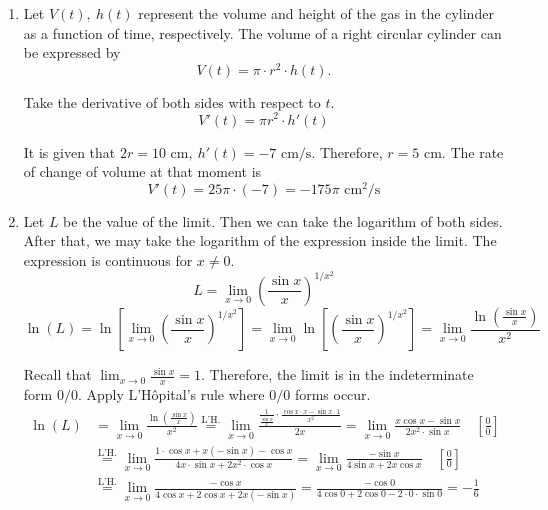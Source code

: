 \documentclass[a4paper, 12pt]{article}
\begin{document}
\begin{enumerate}[leftmargin=*,label=\textbf{\arabic*.}]
\begin{enumerate}[leftmargin=*,label=\textbf{\arabic*.}]
\begin{enumerate}[leftmargin=*,label=\textbf{\alph*.}]
\item If the cylinder is placed horizontally, using the Pythagorean theorem, we get
\[\left(\frac h2\right)^2+\left(2r\right)^2=3^2\implies r^2=\frac14\left(9-\frac{h^2}4\right).\]

Rewrite the volume formula.
\[V(h)=\pi\cdot\frac14\left(9-\frac{h^2}4\right)\cdot h\implies0\leq h\leq6\]

Take the first derivative and find the extrema.
\[V'(h) =\frac\pi4\left(9-\frac{3h^2}4\right)=0\implies h=2\sqrt3\]

Check the endpoints.
\[V(0)=0,\quad V(6)=0\]

Since $h=2\sqrt3,$ $r=\sqrt{\frac14\left(9-\frac{(2\sqrt3)^2}4\right)}=\frac{\sqrt6}2$. The volume is then
\[V=\pi r^2 h=\pi\cdot\left(\frac{\sqrt6}2\right)^2\cdot2\sqrt3=\boxed{3\pi\sqrt3}\]
\end{enumerate}

\item Let $V(t),\:h(t)$ represent the volume and height of the gas in the cylinder as a function of time, respectively. The volume of a right circular cylinder can be expressed by
\[V(t)=\pi\cdot r^2\cdot h(t).\]

Take the derivative of both sides with respect to $t$.
\[V'(t)=\pi r^2\cdot h'(t)\]

It is given that $2r=10\text{ cm},\: h'(t)=-7\text{ cm/s}$. Therefore, $r=5$ cm. The rate of change of volume at that moment is
\[V'(t)=25\pi\cdot(-7)=\boxed{-175\pi\text{ cm}^2\text{/s}}\]

\item Let $L$ be the value of the limit. Then we can take the logarithm of both sides. After that, we may take the logarithm of the expression inside the limit. The expression is continuous for $x\neq0$.
\[L=\lim_{x\to0}\left(\frac{\sin x}x\right)^{1/x^2}\]
\[\ln(L) = \ln\left[\lim_{x\to0}\left(\frac{\sin x}x\right)^{1/x^2}\right]=\lim_{x\to0}\ln\left[\left(\frac{\sin x}x\right)^{1/x^2}\right]=\lim_{x\to0}\frac{\ln\left(\frac{\sin x}x\right)}{x^2}\]

Recall that $\displaystyle \lim_{x\to0}\frac{\sin x}x=1$. Therefore, the limit is in the indeterminate form $0/0$. Apply L'Hôpital's rule where $0/0$ forms occur.
\begin{align*}
\ln(L)&=\lim_{x\to0}\frac{\ln\left(\frac{\sin x}x\right)}{x^2}\overset{\text{L'H.}}{=}\lim_{x\to0}\frac{\displaystyle\frac1{\frac{\sin x}x}\cdot\frac{\cos x\cdot x-\sin x\cdot1}{x^2}}{2x}=\lim_{x\to0}\frac{x\cos x-\sin x}{2x^2\cdot\sin x}\quad\left[\frac00\right]\\[1em]&\overset{\text{L'H.}}{=}\lim_{x\to0}\frac{1\cdot\cos x+x(-\sin x)-\cos x}{4x\cdot\sin x+2x^2\cdot\cos x}=\lim_{x\to0}\frac{-\sin x}{4\sin x+2x\cos x}\quad\left[\frac00\right]\\[1em]&\overset{\text{L'H.}}{=}\lim_{x\to0}\frac{-\cos x}{4\cos x+2\cos x+2x(-\sin x)}=\frac{-\cos0}{4\cos0+2\cos0-2\cdot0\cdot\sin0}=-\frac16
\end{align*}


\end{enumerate}
\end{enumerate}
\end{document}
